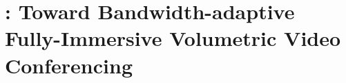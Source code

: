 \chapter{\livo: Toward Bandwidth-adaptive Fully-Immersive Volumetric Video Conferencing}
\label{ch:livo}

\graphicspath{{chapter_livo/}}
